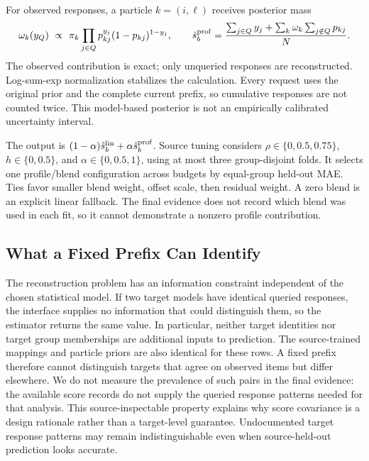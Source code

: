 \documentclass{article}
\begin{document}
For observed responses, a particle $k=(i,\ell)$ receives posterior mass
\begin{equation}
 \omega_k(y_Q)\ \propto\ \pi_k\prod_{j\in Q}p_{kj}^{y_j}(1-p_{kj})^{1-y_j},\qquad
 \hat s^{\rm prof}_b=\frac{\sum_{j\in Q}y_j+\sum_k\omega_k\sum_{j\notin Q}p_{kj}}{N}.
\label{eq:profile}
\end{equation}
The observed contribution is exact; only unqueried responses are reconstructed. Log-sum-exp normalization stabilizes the calculation. Every request uses the original prior and the complete current prefix, so cumulative responses are not counted twice. This model-based posterior is not an empirically calibrated uncertainty interval.

The output is $(1-\alpha)\hat s^{\rm lin}_b+\alpha\hat s^{\rm prof}_b$. Source tuning considers $\rho\in\{0,0.5,0.75\}$, $h\in\{0,0.5\}$, and $\alpha\in\{0,0.5,1\}$, using at most three group-disjoint folds. It selects one profile/blend configuration across budgets by equal-group held-out MAE. Ties favor smaller blend weight, offset scale, then residual weight. A zero blend is an explicit linear fallback. The final evidence does not record which blend was used in each fit, so it cannot demonstrate a nonzero profile contribution.

\subsection{What a Fixed Prefix Can Identify}
The reconstruction problem has an information constraint independent of the chosen statistical model. If two target models have identical queried responses, the interface supplies no information that could distinguish them, so the estimator returns the same value. In particular, neither target identities nor target group memberships are additional inputs to prediction. The source-trained mappings and particle priors are also identical for these rows. A fixed prefix therefore cannot distinguish targets that agree on observed items but differ elsewhere. We do not measure the prevalence of such pairs in the final evidence: the available score records do not supply the queried response patterns needed for that analysis. This source-inspectable property explains why score covariance is a design rationale rather than a target-level guarantee. Undocumented target response patterns may remain indistinguishable even when source-held-out prediction looks accurate.
\end{document}

